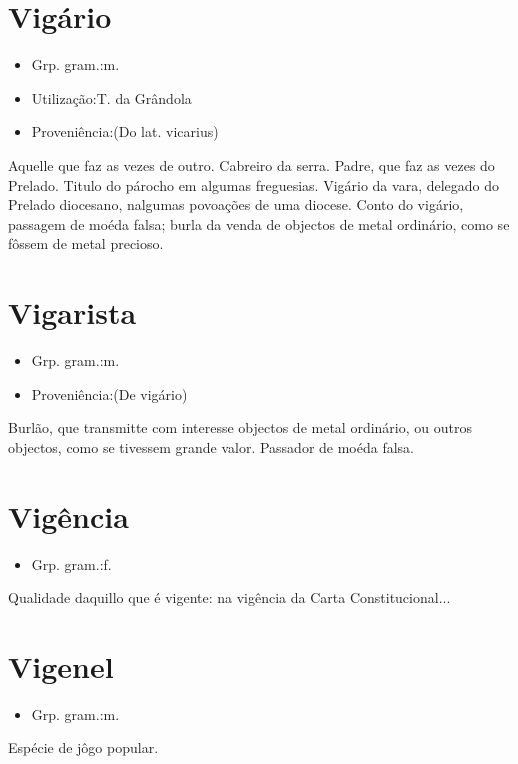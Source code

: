 \documentclass{article}
\begin{document}
\section{Vigário}
\begin{itemize}
\item {Grp. gram.:m.}
\end{itemize}
\begin{itemize}
\item {Utilização:T. da Grândola}
\end{itemize}
\begin{itemize}
\item {Proveniência:(Do lat. \textunderscore vicarius\textunderscore )}
\end{itemize}
Aquelle que faz as vezes de outro.
Cabreiro da serra.
Padre, que faz as vezes do Prelado.
Titulo do párocho em algumas freguesias.
\textunderscore Vigário da vara\textunderscore , delegado do Prelado diocesano, nalgumas povoações de uma diocese.
\textunderscore Conto do vigário\textunderscore , passagem de moéda falsa; burla da venda de objectos de metal ordinário, como se fôssem de metal precioso.
\section{Vigarista}
\begin{itemize}
\item {Grp. gram.:m.}
\end{itemize}
\begin{itemize}
\item {Proveniência:(De \textunderscore vigário\textunderscore )}
\end{itemize}
Burlão, que transmitte com interesse objectos de metal ordinário, ou outros objectos, como se tivessem grande valor.
Passador de moéda falsa.
\section{Vigência}
\begin{itemize}
\item {Grp. gram.:f.}
\end{itemize}
Qualidade daquillo que é vigente: \textunderscore na vigência da Carta Constitucional...\textunderscore 
\section{Vigenel}
\begin{itemize}
\item {Grp. gram.:m.}
\end{itemize}
Espécie de jôgo popular.
\end{document}
